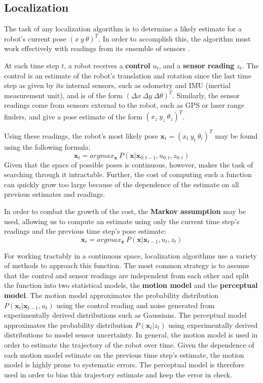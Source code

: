 \documentclass[letterpaper, 12 pt, conference]{ieeeconf}  %
\begin{document}
\subsection{Localization}
The task of any localization algorithm is to determine a likely estimate for a robot's current pose $(x~y~\theta)^T$. In order to accomplish this, the algorithm must work effectively with readings from its ensemble of sensors \cite{thrun2002robotic}. 
\par
At each time step $t$, a robot receives a \textbf{control} $u_t$, and a \textbf{sensor reading} $z_t$. The control is an estimate of the robot's translation and rotation since the last time step as given by its internal sensors, such as odometry and IMU (inertial measurement unit), and is of the form $(\Delta x~\Delta y~\Delta \theta)^T$. Similarly, the sensor readings come from sensors external to the robot, such as GPS or laser range finders, and give a pose estimate of the form $(x_z~y_z~\theta _z)^T$. 
\par 
Using these readings, the robot's most likely pose $\textbf{x}_t=(x_t~y_t~\theta _t)^T$ may be found using the following formula: 
$$
\textbf{x}_t = argmax_{\textbf{x}}~P(\textbf{x}|\textbf{x}_{0:t-1}, u_{0:t}, z_{0:t})
$$
Given that the space of possible poses is continuous, however, makes the task of searching through it intractable. Further, the cost of computing such a function can quickly grow too large because of the dependence of the estimate on all previous estimates and readings. 
\par
In order to combat the growth of the cost, the \textbf{Markov assumption} may be used, allowing us to compute an estimate using only the current time step's readings and the previous time step's pose estimate:
$$
\textbf{x}_t = argmax_{\textbf{x}}~P(\textbf{x}|\textbf{x}_{t-1}, u_t, z_t)
$$
\par
For working tractably in a continuous space, localization algorithms use a variety of methods to approach this function. The most common strategy is to assume that the control and sensor readings are independent from each other and split the function into two statistical models, the \textbf{motion model} and the \textbf{perceptual model}. The motion model approximates the probability distribution $P(\textbf{x}_t|\textbf{x}_{t-1},u_t)$ using the control reading and noise generated from experimentally derived distributions such as Gaussians. The perceptual model approximates the probability distribution $P(\textbf{x}_t|z_t)$ using experimentally derived distributions to model sensor uncertainty. In general, the motion model is used in order to estimate the trajectory of the robot over time. Given the dependence of each motion model estimate on the previous time step's estimate, the motion model is highly prone to systematic errors. The perceptual model is therefore used in order to bias this trajectory estimate and keep the error in check. 
\end{document}
